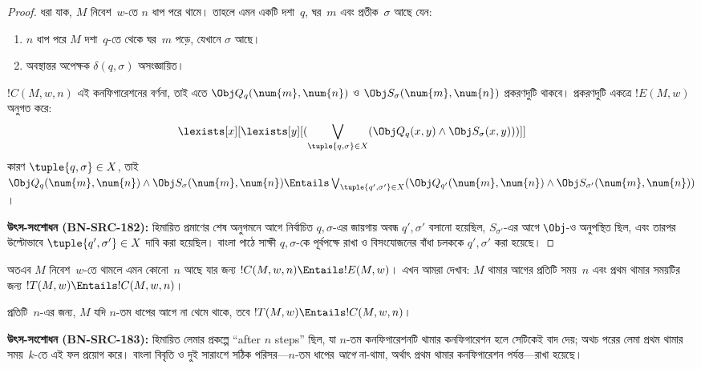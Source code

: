 \documentclass[../../../include/open-logic-section]{subfiles}
\begin{document}
\begin{proof}
ধরা যাক, $M$ নিবেশ~$w$-তে $n$ ধাপ পরে থামে। তাহলে এমন একটি দশা~$q$,
ঘর~$m$ এবং প্রতীক~$\sigma$ আছে যেন:
\begin{enumerate}
\item $n$ ধাপ পরে $M$ দশা~$q$-তে থেকে ঘর~$m$ পড়ে, যেখানে
  $\sigma$ আছে।
\item অবস্থান্তর অপেক্ষক $\delta(q,\sigma)$ অসংজ্ঞায়িত।
\end{enumerate}
$!C(M,w,n)$ এই কনফিগারেশনের বর্ণনা, তাই এতে
$\Obj Q_{q}(\num{m},\num{n})$ ও
$\Obj S_{\sigma}(\num{m},\num{n})$ প্রকরণদুটি থাকবে। প্রকরণদুটি একত্রে
$!E(M,w)$ অনুগত করে:
\[
\lexists[x][\lexists[y][(\bigvee_{\tuple{q, \sigma} \in
      X}(\Obj Q_q(x, y) \land \Obj S_\sigma(x, y)))]]
\]
কারণ $\tuple{q,\sigma}\in X$, তাই
$\Obj Q_q(\num{m},\num{n})\land\Obj S_\sigma(\num{m},\num{n})
\Entails \bigvee_{\tuple{q',\sigma'}\in X}
(\Obj Q_{q'}(\num{m},\num{n})\land
\Obj S_{\sigma'}(\num{m},\num{n}))$।
\par\smallskip\noindent\textnormal{\small\textbf{উৎস-সংশোধন (BN-SRC-182):} হিমায়িত প্রমাণের শেষ অনুগমনে আগে নির্বাচিত $q,\sigma$-এর জায়গায় অবন্ধ $q',\sigma'$ বসানো হয়েছিল, $S_{\sigma'}$-এর আগে \texttt{\textbackslash Obj}-ও অনুপস্থিত ছিল, এবং তারপর উল্টোভাবে $\tuple{q',\sigma'}\in X$ দাবি করা হয়েছিল। বাংলা পাঠে সাক্ষী $q,\sigma$-কে পূর্বপক্ষে রাখা ও বিসংযোজনের বাঁধা চলককে $q',\sigma'$ করা হয়েছে।} %
\end{proof}

\begin{explain}
অতএব $M$ নিবেশ~$w$-তে থামলে এমন কোনো~$n$ আছে যার জন্য
$!C(M,w,n)\Entails !E(M,w)$। এখন আমরা দেখাব: $M$ থামার আগের প্রতিটি
সময়~$n$ এবং প্রথম থামার সময়টির জন্য
$!T(M,w)\Entails !C(M,w,n)$।
\end{explain}

\begin{lem}
প্রতিটি~$n$-এর জন্য, $M$ যদি $n$-তম ধাপের আগে না থেমে থাকে, তবে
$!T(M,w)\Entails !C(M,w,n)$।
\end{lem}
\par\smallskip\noindent\textnormal{\small\textbf{উৎস-সংশোধন (BN-SRC-183):} হিমায়িত লেমার প্রকল্পে “after $n$ steps” ছিল, যা $n$-তম কনফিগারেশনটি থামার কনফিগারেশন হলে সেটিকেই বাদ দেয়; অথচ পরের লেমা প্রথম থামার সময়~$k$-তে এই ফল প্রয়োগ করে। বাংলা বিবৃতি ও দুই সারাংশে সঠিক পরিসর—$n$-তম ধাপের \emph{আগে} না-থামা, অর্থাৎ প্রথম থামার কনফিগারেশন পর্যন্ত—রাখা হয়েছে।} %
\end{document}
